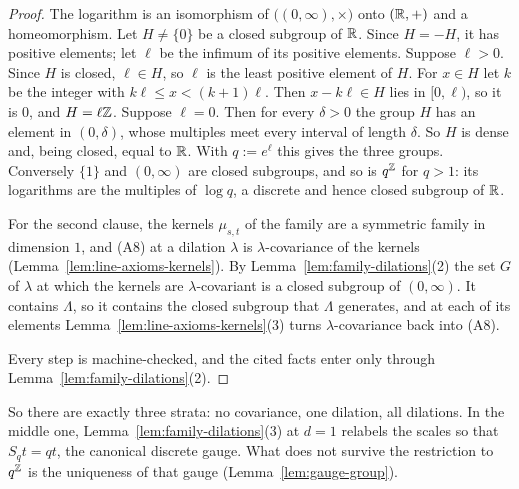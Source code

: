 \begin{proof}
\leanok
{}
The logarithm is an isomorphism of $\bigl((0,\infty),\times\bigr)$ onto $(\mathbb{R},+)$ and a
homeomorphism. Let $H \ne \{0\}$ be a closed subgroup of $\mathbb{R}$. Since $H = -H$, it has positive
elements; let $\ell$ be the infimum of its positive elements. Suppose $\ell > 0$. Since $H$ is
closed, $\ell \in H$, so $\ell$ is the least positive element of $H$. For $x \in H$ let $k$ be
the integer with
$k\ell \le x < (k+1)\ell$. Then $x - k\ell \in H$ lies in $[0, \ell)$, so it is $0$, and
$H = \ell\mathbb{Z}$. Suppose $\ell = 0$. Then for every $\delta > 0$ the group $H$ has an element in
$(0,\delta)$, whose multiples meet every interval of length $\delta$. So $H$ is dense and, being
closed, equal to $\mathbb{R}$. With $q := e^\ell$ this gives the three groups. Conversely $\{1\}$ and
$(0,\infty)$ are closed subgroups, and so is $q^{\mathbb{Z}}$ for $q > 1$: its logarithms are the
multiples of $\log q$, a discrete and hence closed subgroup of $\mathbb{R}$.

For the second clause, the kernels $\mu_{s,t}$ of the family are a symmetric family in dimension
$1$, and (A8) at a dilation $\lambda$ is $\lambda$-covariance of the kernels
(Lemma~\ref{lem:line-axioms-kernels}). By Lemma~\ref{lem:family-dilations}(2) the set $G$ of
$\lambda$ at which the kernels are $\lambda$-covariant is a closed subgroup of $(0,\infty)$. It
contains $\Lambda$, so it contains the closed subgroup that $\Lambda$ generates, and at each of
its elements Lemma~\ref{lem:line-axioms-kernels}(3) turns $\lambda$-covariance back into (A8).

Every step is machine-checked, and the cited facts enter only through
Lemma~\ref{lem:family-dilations}(2).
\end{proof}

So there are exactly three strata: no covariance, one dilation, all dilations. In the middle one,
Lemma~\ref{lem:family-dilations}(3) at $d = 1$ relabels the scales so that $S_qt = qt$, the
canonical discrete gauge. What does not survive the restriction to $q^{\mathbb{Z}}$ is the uniqueness of
that gauge (Lemma~\ref{lem:gauge-group}).

